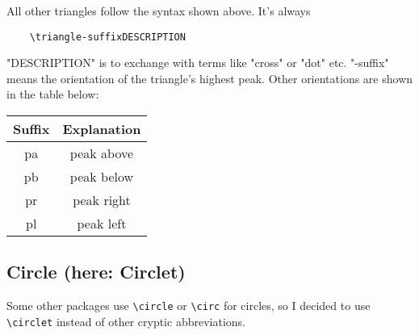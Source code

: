 \documentclass[
	a4paper,
	parskip=half,
    pagesize=auto,      		%
    listof=totoc,   		%
    bibliography=totoc,
	11pt
]{scrartcl}
\begin{document}
All other triangles follow the syntax shown above. It's always 

\begin{lstlisting}
	\triangle-suffixDESCRIPTION
\end{lstlisting}

"DESCRIPTION" is to exchange with terms like "cross" or "dot" etc. "-suffix" means the orientation of the triangle's highest peak. 
Other orientations are shown in the table below:


\begin{table}[H]
\centering
\begin{tabular}{|c|c|}
\hline
Suffix	&	Explanation	   \\ \hline \hline
pa & peak above \\ \hline
pb & peak below \\ \hline
pr & peak right \\ \hline
pl & peak left \\ \hline
\end{tabular}
\end{table}


\newpage
\subsection{Circle (here: Circlet)}

Some other packages use \lstinline{\circle} or \lstinline{\circ} for circles, so I decided to use \lstinline{\circlet} instead of other cryptic abbreviations.    
\end{document}
